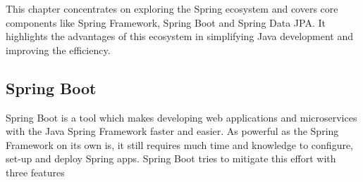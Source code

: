 \Author{\daAuthorThree}
    This chapter concentrates on exploring the Spring ecosystem and covers core components like Spring Framework, Spring Boot and Spring Data JPA. It highlights the advantages of this ecosystem in simplifying Java development and improving the efficiency.

    \subsection{Spring Boot}
    Spring Boot is a tool which makes developing web applications and microservices with the Java Spring Framework faster and easier. As powerful as the Spring Framework on its own is, it still requires much time and knowledge to configure, set-up and deploy Spring apps. Spring Boot tries to mitigate this effort with three features 

